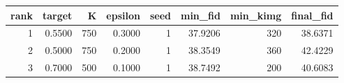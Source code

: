 \begin{tabular}{rrrrrrrr}
\toprule
rank & target & K & epsilon & seed & min_fid & min_kimg & final_fid \\
\midrule
1 & 0.5500 & 750 & 0.3000 & 1 & 37.9206 & 320 & 38.6371 \\
2 & 0.5000 & 750 & 0.2000 & 1 & 38.3549 & 360 & 42.4229 \\
3 & 0.7000 & 500 & 0.1000 & 1 & 38.7492 & 200 & 40.6083 \\
\bottomrule
\end{tabular}
